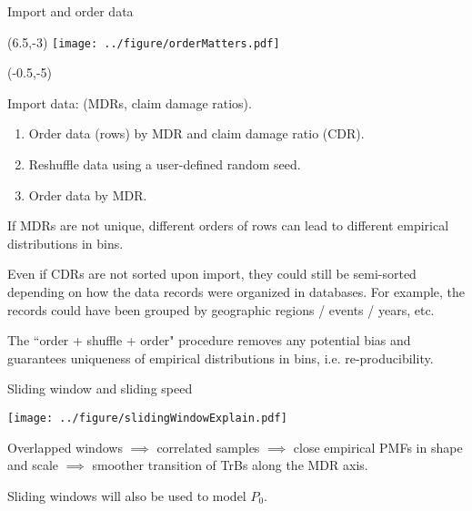 \documentclass[aspectratio=169]{beamer}
\begin{document}
\begin{frame}{Import and order data}

\begin{textblock}{1}(6.5,-3)
\texttt{[image: ../figure/orderMatters.pdf]}
\end{textblock}


\begin{textblock}{6.5}(-0.5,-5)

\scriptsize Import data: (MDRs, claim damage ratios).\medskip

\begin{enumerate}
\item Order data (rows) by MDR and claim damage ratio (CDR).\medskip

\item Reshuffle data using a user-defined random seed.\medskip

\item Order data by MDR.\medskip
\end{enumerate}

If MDRs are not unique, different orders of rows can lead to different empirical distributions in bins.\medskip\pause

Even if CDRs are not sorted upon import, they could still be semi-sorted depending on how the data records were organized in databases. For example, the records could have been grouped by geographic regions / events / years, etc. \medskip\pause

The ``order + shuffle + order" procedure removes any potential bias and guarantees uniqueness of empirical distributions in bins, i.e. re-producibility. 

\end{textblock}


\end{frame}


\begin{frame}{Sliding window and sliding speed}
\begin{center}
\texttt{[image: ../figure/slidingWindowExplain.pdf]}
\end{center}
Overlapped windows $\implies$ correlated samples $\implies$ close empirical PMFs in shape and scale $\implies$ smoother transition of TrBs along the MDR axis.\medskip

Sliding windows will also be used to model $P_0$.
\end{frame}
\end{document}
